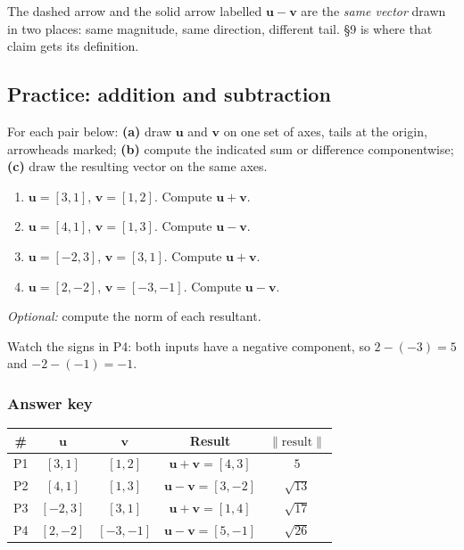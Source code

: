 \documentclass[11pt]{article}
\theoremstyle{definition}
\theoremstyle{remark}
\newcommand{\vc}[1]{\mathbf{#1}}
\newcommand{\norm}[1]{\lVert #1\rVert}
\begin{document}
\noindent The dashed arrow and the solid arrow labelled $\vc{u}-\vc{v}$ are the
\emph{same vector} drawn in two places: same magnitude, same direction,
different tail. \S9 is where that claim gets its definition.

\subsection{Practice: addition and subtraction}
For each pair below: \textbf{(a)} draw $\vc{u}$ and $\vc{v}$ on one set of axes,
tails at the origin, arrowheads marked; \textbf{(b)} compute the indicated sum
or difference componentwise; \textbf{(c)} draw the resulting vector on the same
axes.

\begin{enumerate}[label=\textbf{P\arabic*.},leftmargin=2.8em,itemsep=7pt,
                  topsep=6pt]
  \item $\vc{u}=[3,1]$, \quad $\vc{v}=[1,2]$. \quad Compute $\vc{u}+\vc{v}$.
  \item $\vc{u}=[4,1]$, \quad $\vc{v}=[1,3]$. \quad Compute $\vc{u}-\vc{v}$.
  \item $\vc{u}=[-2,3]$, \quad $\vc{v}=[3,1]$. \quad Compute $\vc{u}+\vc{v}$.
  \item $\vc{u}=[2,-2]$, \quad $\vc{v}=[-3,-1]$. \quad Compute $\vc{u}-\vc{v}$.
\end{enumerate}

\medskip
\noindent\emph{Optional:} compute the norm of each resultant.

\smallskip
\noindent Watch the signs in P4: both inputs have a negative component, so
$2-(-3)=5$ and $-2-(-1)=-1$.

\subsubsection*{Answer key}
\begin{center}
\renewcommand{\arraystretch}{1.3}
\begin{tabular}{@{}c c c c c@{}}
\toprule
\textbf{\#} & $\vc{u}$ & $\vc{v}$ & \textbf{Result} & $\norm{\text{result}}$ \\
\midrule
P1 & $[3,1]$   & $[1,2]$    & $\vc{u}+\vc{v}=[4,3]$   & $5$ \\
P2 & $[4,1]$   & $[1,3]$    & $\vc{u}-\vc{v}=[3,-2]$  & $\sqrt{13}$ \\
P3 & $[-2,3]$  & $[3,1]$    & $\vc{u}+\vc{v}=[1,4]$   & $\sqrt{17}$ \\
P4 & $[2,-2]$  & $[-3,-1]$  & $\vc{u}-\vc{v}=[5,-1]$  & $\sqrt{26}$ \\
\bottomrule
\end{tabular}
\end{center}
\end{document}
